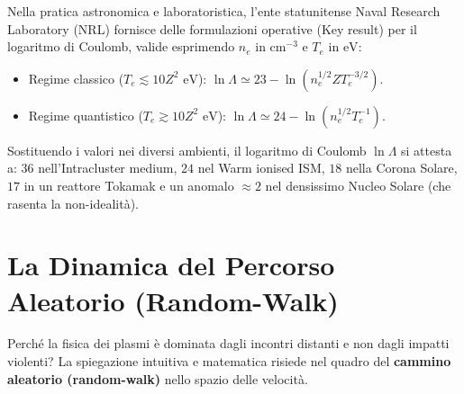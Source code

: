 Nella pratica astronomica e laboratoristica, l'ente statunitense Naval Research Laboratory (NRL) fornisce delle formulazioni operative (Key result) per il logaritmo di Coulomb, valide esprimendo $n_e$ in $\text{cm}^{-3}$ e $T_e$ in $\text{eV}$:
\begin{itemize}
\item Regime classico ($T_e \lesssim 10 Z^2 \text{ eV}$): $\ln \Lambda \simeq 23 - \ln(n_e^{1/2} Z T_e^{-3/2})$.
\item Regime quantistico ($T_e \gtrsim 10 Z^2 \text{ eV}$): $\ln \Lambda \simeq 24 - \ln(n_e^{1/2} T_e^{-1})$.
\end{itemize}
Sostituendo i valori nei diversi ambienti, il logaritmo di Coulomb $\ln \Lambda$ si attesta a: $36$ nell'Intracluster medium, $24$ nel Warm ionised ISM, $18$ nella Corona Solare, $17$ in un reattore Tokamak e un anomalo $\approx 2$ nel densissimo Nucleo Solare (che rasenta la non-idealità).

\section{La Dinamica del Percorso Aleatorio (Random-Walk)}

Perché la fisica dei plasmi è dominata dagli incontri distanti e non dagli impatti violenti? La spiegazione intuitiva e matematica risiede nel quadro del \textbf{cammino aleatorio (random-walk)} nello spazio delle velocità.

